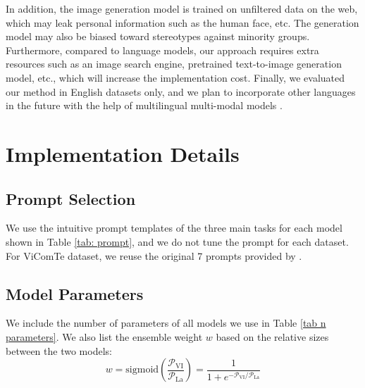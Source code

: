 \documentclass[11pt]{article}
\begin{document}
In addition, the image generation model is trained on unfiltered data on the web, which may leak personal information such as the human face, etc. The generation model may also be biased toward stereotypes against minority groups. Furthermore, compared to language models, our approach requires extra resources such as an image search engine, pretrained text-to-image generation model, etc., which will increase the implementation cost. Finally, we evaluated our method in English datasets only, and we plan to incorporate other languages in the future with the help of multilingual multi-modal models \cite{huang-etal-2021-multilingual}. 



\clearpage

\appendix
\section{Implementation Details}
\subsection{Prompt Selection}
We use the intuitive prompt templates of the three main tasks for each model shown in Table \ref{tab: prompt}, and we do not tune the prompt for each dataset. For ViComTe dataset, we reuse the original 7 prompts provided by \citet{zhang-etal-2022-visual}. 


\subsection{Model Parameters}
We include the number of parameters of all models we use in Table \ref{tab n parameters}. We also list the ensemble weight $w$ based on the relative sizes between the two models:
\begin{equation}
    w = \text{sigmoid}\left(\frac{\mathcal{P}_{\text{VI}}}{\mathcal{P}_{\text{La}}}\right) = \frac{1}{1 + e^{-\mathcal{P}_{\text{VI}} / \mathcal{P}_{\text{La}}}}
\end{equation}
\end{document}
